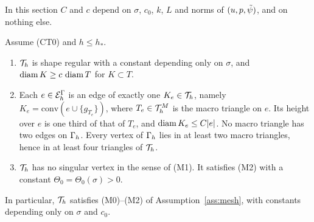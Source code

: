 In this section $C$ and $c$ depend on $\sigma$, $c_0$, $k$, $L$ and norms of $(u,p,\tilde\psi)$, and on nothing else.

\begin{lemma}\label{ct:lem:mesh}
Assume (CT0) and $h\le h_\ast$.
\begin{enumerate}[label=(\alph*)]
\item $\mathcal T_h$ is shape regular with a constant depending only on $\sigma$, and $\operatorname{diam} K\ge c\,\operatorname{diam} T$ for $K\subset T$.
\item Each $e\in\mathcal E_h^\Gamma$ is an edge of exactly one $K_e\in\mathcal T_h$, namely $K_e=\mathrm{conv}(e\cup\{g_{T_e}\})$, where $T_e\in\mathcal T_h^M$ is the macro triangle on $e$. Its height over $e$ is one third of that of $T_e$, and $\operatorname{diam} K_e\le C|e|$. No macro triangle has two edges on $\Gamma_h$. Every vertex of $\Gamma_h$ lies in at least two macro triangles, hence in at least four triangles of $\mathcal T_h$.
\item $\mathcal T_h$ has no singular vertex in the sense of (M1). It satisfies (M2) with a constant $\Theta_0=\Theta_0(\sigma)>0$.
\end{enumerate}
In particular, $\mathcal T_h$ satisfies (M0)--(M2) of Assumption~\ref{ass:mesh}, with constants depending only on $\sigma$ and $c_0$.
\end{lemma}

